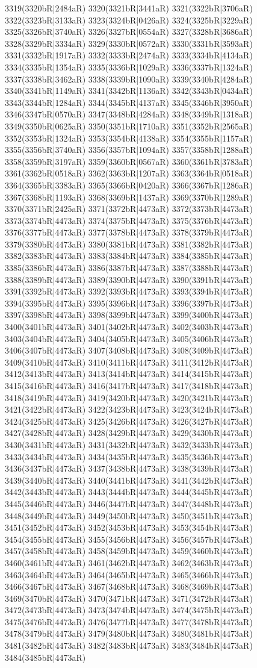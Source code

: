 3319(3320bR|2484aR) 3320(3321bR|3441aR) 3321(3322bR|3706aR) 3322(3323bR|3133aR) 3323(3324bR|0426aR) 3324(3325bR|3229aR) 3325(3326bR|3740aR) 3326(3327bR|0554aR) 3327(3328bR|3686aR) 3328(3329bR|3334aR) 3329(3330bR|0572aR) 3330(3331bR|3593aR) 3331(3332bR|1917aR) 3332(3333bR|2474aR) 3333(3334bR|4134aR) 3334(3335bR|1354aR) 3335(3336bR|1029aR) 3336(3337bR|1324aR) 3337(3338bR|3462aR) 3338(3339bR|1090aR) 3339(3340bR|4284aR) 3340(3341bR|1149aR) 3341(3342bR|1136aR) 3342(3343bR|0434aR) 3343(3344bR|1284aR) 3344(3345bR|4137aR) 3345(3346bR|3950aR) 3346(3347bR|0570aR) 3347(3348bR|4284aR) 3348(3349bR|1318aR) 3349(3350bR|0625aR) 3350(3351bR|1710aR) 3351(3352bR|2565aR) 3352(3353bR|1324aR) 3353(3354bR|4138aR) 3354(3355bR|1157aR) 3355(3356bR|3740aR) 3356(3357bR|1094aR) 3357(3358bR|1288aR) 3358(3359bR|3197aR) 3359(3360bR|0567aR) 3360(3361bR|3783aR) 3361(3362bR|0518aR) 3362(3363bR|1207aR) 3363(3364bR|0518aR) 3364(3365bR|3383aR) 3365(3366bR|0420aR) 3366(3367bR|1286aR) 3367(3368bR|1193aR) 3368(3369bR|1437aR) 3369(3370bR|1289aR) 3370(3371bR|2425aR) 3371(3372bR|4473aR) 3372(3373bR|4473aR) 3373(3374bR|4473aR) 3374(3375bR|4473aR) 3375(3376bR|4473aR) 3376(3377bR|4473aR) 3377(3378bR|4473aR) 3378(3379bR|4473aR) 3379(3380bR|4473aR) 3380(3381bR|4473aR) 3381(3382bR|4473aR) 3382(3383bR|4473aR) 3383(3384bR|4473aR) 3384(3385bR|4473aR) 3385(3386bR|4473aR) 3386(3387bR|4473aR) 3387(3388bR|4473aR) 3388(3389bR|4473aR) 3389(3390bR|4473aR) 3390(3391bR|4473aR) 3391(3392bR|4473aR) 3392(3393bR|4473aR) 3393(3394bR|4473aR) 3394(3395bR|4473aR) 3395(3396bR|4473aR) 3396(3397bR|4473aR) 3397(3398bR|4473aR) 3398(3399bR|4473aR) 3399(3400bR|4473aR) 3400(3401bR|4473aR) 3401(3402bR|4473aR) 3402(3403bR|4473aR) 3403(3404bR|4473aR) 3404(3405bR|4473aR) 3405(3406bR|4473aR) 3406(3407bR|4473aR) 3407(3408bR|4473aR) 3408(3409bR|4473aR) 3409(3410bR|4473aR) 3410(3411bR|4473aR) 3411(3412bR|4473aR) 3412(3413bR|4473aR) 3413(3414bR|4473aR) 3414(3415bR|4473aR) 3415(3416bR|4473aR) 3416(3417bR|4473aR) 3417(3418bR|4473aR) 3418(3419bR|4473aR) 3419(3420bR|4473aR) 3420(3421bR|4473aR) 3421(3422bR|4473aR) 3422(3423bR|4473aR) 3423(3424bR|4473aR) 3424(3425bR|4473aR) 3425(3426bR|4473aR) 3426(3427bR|4473aR) 3427(3428bR|4473aR) 3428(3429bR|4473aR) 3429(3430bR|4473aR) 3430(3431bR|4473aR) 3431(3432bR|4473aR) 3432(3433bR|4473aR) 3433(3434bR|4473aR) 3434(3435bR|4473aR) 3435(3436bR|4473aR) 3436(3437bR|4473aR) 3437(3438bR|4473aR) 3438(3439bR|4473aR) 3439(3440bR|4473aR) 3440(3441bR|4473aR) 3441(3442bR|4473aR) 3442(3443bR|4473aR) 3443(3444bR|4473aR) 3444(3445bR|4473aR) 3445(3446bR|4473aR) 3446(3447bR|4473aR) 3447(3448bR|4473aR) 3448(3449bR|4473aR) 3449(3450bR|4473aR) 3450(3451bR|4473aR) 3451(3452bR|4473aR) 3452(3453bR|4473aR) 3453(3454bR|4473aR) 3454(3455bR|4473aR) 3455(3456bR|4473aR) 3456(3457bR|4473aR) 3457(3458bR|4473aR) 3458(3459bR|4473aR) 3459(3460bR|4473aR) 3460(3461bR|4473aR) 3461(3462bR|4473aR) 3462(3463bR|4473aR) 3463(3464bR|4473aR) 3464(3465bR|4473aR) 3465(3466bR|4473aR) 3466(3467bR|4473aR) 3467(3468bR|4473aR) 3468(3469bR|4473aR) 3469(3470bR|4473aR) 3470(3471bR|4473aR) 3471(3472bR|4473aR) 3472(3473bR|4473aR) 3473(3474bR|4473aR) 3474(3475bR|4473aR) 3475(3476bR|4473aR) 3476(3477bR|4473aR) 3477(3478bR|4473aR) 3478(3479bR|4473aR) 3479(3480bR|4473aR) 3480(3481bR|4473aR) 3481(3482bR|4473aR) 3482(3483bR|4473aR) 3483(3484bR|4473aR) 3484(3485bR|4473aR) 